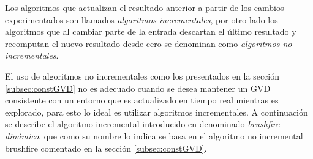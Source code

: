 Los algoritmos que actualizan el resultado anterior a partir de los cambios experimentados son llamados \emph{algoritmos incrementales}, por otro lado los algoritmos que al cambiar parte de la entrada descartan el último resultado y recomputan el nuevo resultado desde cero se denominan como \emph{algoritmos no incrementales}.

El uso de algoritmos no incrementales como los presentados en la sección \ref{subsec:constGVD} no es adecuado cuando se desea mantener un GVD consistente con un entorno que es actualizado en tiempo real mientras es explorado, para esto lo ideal es utilizar algoritmos incrementales. A continuación se describe el algoritmo incremental introducido en \cite{kalra2009incremental} denominado \emph{brushfire dinámico}, que como su nombre lo indica se basa en el algoritmo no incremental brushfire comentado en la sección \ref{subsec:constGVD}.



